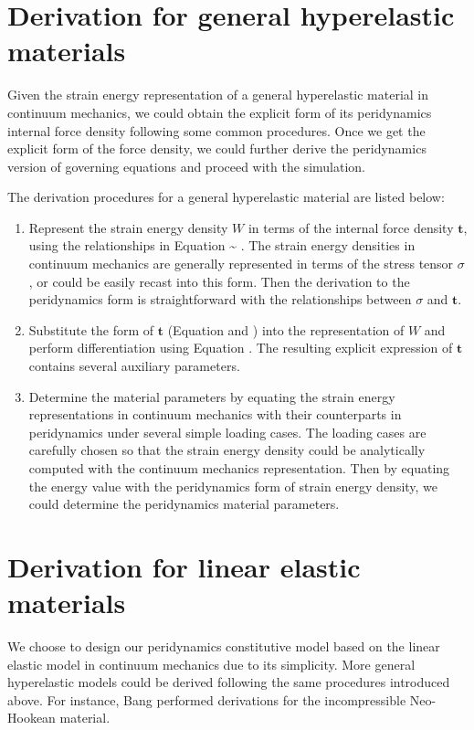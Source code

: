 \documentclass[11pt,fullpage]{article}
\newcommand{\mb}[1]{\mathbf{#1}}
\newcommand{\blue}[1]{{\color{blue}{{#1}}}}
\begin{document}
\section{Derivation for general hyperelastic materials}\label{section:3}

Given the strain energy representation of a general hyperelastic material in continuum mechanics, we could obtain the explicit form of its peridynamics internal force density following some common procedures. Once we get the explicit form of the force density, we could further derive the peridynamics version of governing equations and proceed with the simulation.

The derivation procedures for a general hyperelastic material are listed below:
\begin{enumerate}
\item{Represent the strain energy density $W$ in terms of the internal force density $\mb{t}$, using the relationships in Equation \blue{\ref{eq:7}} \~{} \blue{\ref{eq:10}}. The strain energy densities in continuum mechanics are generally represented in terms of the stress tensor $\sigma$, or could be easily recast into this form. Then the derivation to the peridynamics form is straightforward with the relationships between $\sigma$ and $\mb{t}$.}
\item{Substitute the form of $\mb{t}$ (Equation \blue{\ref{eq:12}} and \blue{\ref{eq:13}}) into the representation of $W$ and perform differentiation using Equation \blue{\ref{eq:11}}. The resulting explicit expression of $\mb{t}$ contains several auxiliary parameters.}
\item{Determine the material parameters by equating the strain energy representations in continuum mechanics with their counterparts in peridynamics under several simple loading cases. The loading cases are carefully chosen so that the strain energy density could be analytically computed with the continuum mechanics representation. Then by equating the energy value with the peridynamics form of strain energy density, we could determine the peridynamics material parameters.}
\end{enumerate}

\section{Derivation for linear elastic materials}\label{section:4}

We choose to design our peridynamics constitutive model based on the linear elastic model in continuum mechanics due to its simplicity. More general hyperelastic models could be derived following the same procedures introduced above. For instance, Bang\blue{\cite{bang2016peridynamic}} performed derivations for the incompressible Neo-Hookean material.
\end{document}
